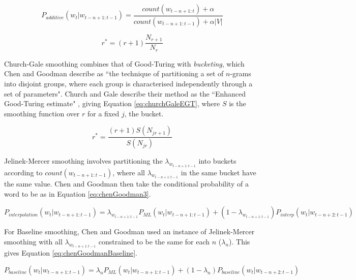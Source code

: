 \begin{equation}
\label{eq:additiveSmoothing}
P_{additive}(w_{t}|w_{t-n+1:t-1})=\frac{count(w_{t-n+1:t})+\alpha}{count(w_{t-n+1:t-1})+\alpha|V|}
\end{equation}

\begin{equation}
\label{eq:goodTuringSmoothing}
r^{*}=(r+1)\frac{N_{r+1}}{N_{r}}
\end{equation}

Church-Gale smoothing combines that of Good-Turing with \textit{bucketing}, which Chen and Goodman describe as ``the technique of partitioning a set of $n$-grams into disjoint groups, where each group is characterised independently through a set of parameters". Church and Gale describe their method as the ``Enhanced Good-Turing estimate" \cite{church1991comparison}, giving Equation \ref{eq:churchGaleEGT}, where $S$ is the smoothing function over $r$ for a fixed $j$, the bucket.

\begin{equation}
r^{*}=\frac{(r+1)S(N_{jr+1})}{S(N_{jr})}
\label{eq:churchGaleEGT}
\end{equation}

%
Jelinek-Mercer smoothing involves partitioning the $\lambda_{w_{t-n+1:t-1}}$ into buckets according to $count(w_{t-n+1:t-1})$, where all $\lambda_{w_{t-n+1:t-1}}$ in the same bucket have the same value. Chen and Goodman then take the conditional probability of a word to be as in Equation \ref{eq:chenGoodman3}.

\begin{equation}
P_{interpolation}(w_{t}|w_{t-n+1:t-1})=\lambda_{w_{t-n+1:t-1}}P_{ML}(w_{t}|w_{t-n+1:t-1})+(1-\lambda_{w_{t-n+1:t-1}})P_{interp}(w_{t}|w_{t-n+2:t-1})
\label{eq:chenGoodman3}
\end{equation}

For Baseline smoothing, Chen and Goodman used an instance of Jelinek-Mercer smoothing with all $\lambda_{w_{t-n+1:t-1}}$ constrained to be the same for each $n$ ($\lambda_{n}$). This gives Equation \ref{eq:chenGoodmanBaseline}.

\begin{equation}
P_{baseline}(w_{t}|w_{t-n+1:t-1})=\lambda_{n}P_{ML}(w_{t}|w_{t-n+1:t-1})+(1-\lambda_{n})P_{baseline}(w_{t}|w_{t-n+2:t-1})
\label{eq:chenGoodmanBaseline}
\end{equation}

